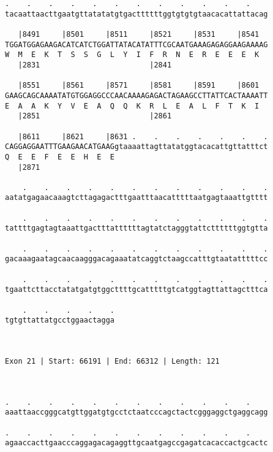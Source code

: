 \documentclass{article}
\begin{document}
\begin{Verbatim}
.    .    .    .    .    .    .    .    .    .    .    .    
tacaattaacttgaatgttatatatgtgacttttttggtgtgtgtaacacattattacag
                                                            
   |8491     |8501     |8511     |8521     |8531     |8541  
TGGATGGAGAAGACATCATCTGGATTATACATATTTCGCAATGAAAGAGAGGAAGAAAAG
W  M  E  K  T  S  S  G  L  Y  I  F  R  N  E  R  E  E  E  K  
   |2831                         |2841                      
  
   |8551     |8561     |8571     |8581     |8591     |8601  
GAAGCAGCAAAATATGTGGAGGCCCAACAAAAGAGACTAGAAGCCTTATTCACTAAAATT
E  A  A  K  Y  V  E  A  Q  Q  K  R  L  E  A  L  F  T  K  I  
   |2851                         |2861                      
  
   |8611     |8621     |8631 .    .    .    .    .    .    .
CAGGAGGAATTTGAAGAACATGAAGgtaaaattagttatatggtacacattgttatttct
Q  E  E  F  E  E  H  E  E                                   
   |2871                                                    
  
    .    .    .    .    .    .    .    .    .    .    .    .
aatatgagaacaaagtcttagagactttgaatttaacatttttaatgagtaaattgtttt
                                                            
    .    .    .    .    .    .    .    .    .    .    .    .
tattttgagtagtaaattgactttattttttagtatctagggtattcttttttggtgtta
                                                            
    .    .    .    .    .    .    .    .    .    .    .    .
gacaaagaatagcaacaagggacagaaatatcaggtctaagccatttgtaatatttttcc
                                                            
    .    .    .    .    .    .    .    .    .    .    .    .
tgaattcttacctatatgatgtggcttttgcatttttgtcatggtagttattagctttca
                                                            
    .    .    .    .    .
tgtgttattatgcctggaactagga
                         
                         
 
Exon 21 | Start: 66191 | End: 66312 | Length: 121



.    .    .    .    .    .    .    .    .    .    .    .    
aaattaaccgggcatgttggatgtgcctctaatcccagctactcgggaggctgaggcagg
                                                            
.    .    .    .    .    .    .    .    .    .    .    .    
agaaccacttgaacccaggagacagaggttgcaatgagccgagatcacaccactgcactc
                                                            

\end{Verbatim}
\end{document}
